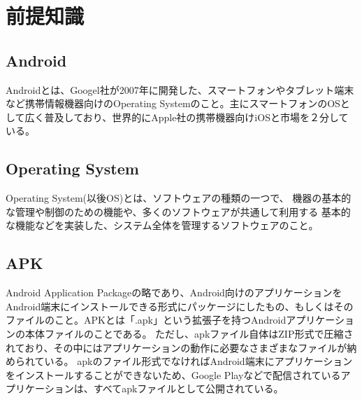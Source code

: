 \newpage
\section{前提知識}

\subsection{Android}
Androidとは、Googel社が2007年に開発した、スマートフォンやタブレット端末など携帯情報機器向けのOperating Systemのこと。主にスマートフォンのOSとして広く普及しており、世界的にApple社の携帯機器向けiOSと市場を２分している。

\subsection{Operating System}
Operating System(以後OS)とは、ソフトウェアの種類の一つで、
機器の基本的な管理や制御のための機能や、多くのソフトウェアが共通して利用する
基本的な機能などを実装した、システム全体を管理するソフトウェアのこと。
\subsection{APK}
Android Application Packageの略であり、Android向けのアプリケーションをAndroid端末にインストールできる形式にパッケージにしたもの、もしくはそのファイルのこと。APKとは「.apk」という拡張子を持つAndroidアプリケーションの本体ファイルのことである。
ただし、apkファイル自体はZIP形式で圧縮されており、その中にはアプリケーションの動作に必要なさまざまなファイルが納められている。
apkのファイル形式でなければAndroid端末にアプリケーションをインストールすることができないため、Google Playなどで配信されているアプリケーションは、すべてapkファイルとして公開されている。
